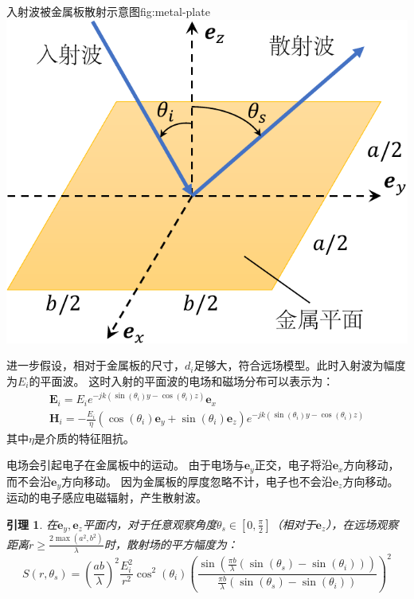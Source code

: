 \documentclass[supercite]{HustGraduPaper}
\newtheorem{lemma}{\indent 引理}[section]
\begin{document}
\begin{generalfig}[htb]{入射波被金属板散射示意图}{fig:metal-plate}
	\includegraphics[width=0.5\linewidth]{Figures/metal-plate.pdf}
\end{generalfig}

进一步假设，相对于金属板的尺寸，$d_i$足够大，符合远场模型。此时入射波为幅度为$E_i$的平面波。
这时入射的平面波的电场和磁场分布可以表示为：
\begin{equation}
	\begin{array}{l}
		\mathbf{E}_{i}=E_{i} e^{-j k\left(\sin \left(\theta_{i}\right) y-\cos \left(\theta_{i}\right) z\right)} \boldsymbol{e}_{x} \\
		\mathbf{H}_{i}=-\frac{E_{i}}{\eta}\left(\cos \left(\theta_{i}\right) \boldsymbol{e}_{y}+\sin \left(\theta_{i}\right) \boldsymbol{e}_{z}\right) e^{-j k\left(\sin \left(\theta_{i}\right) y-\cos \left(\theta_{i}\right) z\right)}
	\end{array}
	\label{eq:e-field}
\end{equation}
其中$\eta$是介质的特征阻抗。

电场会引起电子在金属板中的运动。
由于电场与$\boldsymbol{e}_{y}$正交，电子将沿$\boldsymbol{e}_{x}$方向移动，而不会沿$\boldsymbol{e}_{y}$方向移动。
因为金属板的厚度忽略不计，电子也不会沿$\boldsymbol{e}_{z}$方向移动。
运动的电子感应电磁辐射，产生散射波。

\begin{lemma}
	\label{lemma:scattered-field}
	在$\boldsymbol{e}_{y}, \boldsymbol{e}_{z}$平面内，对于任意观察角度$\theta_{s} \in\left[0, \frac{\pi}{2}\right]$（相对于$\boldsymbol{e}_{z}$），在远场观察距离$r \geq \frac{2 \max \left(a^{2}, b^{2}\right)}{\lambda}$时，散射场的平方幅度为：
	\begin{equation}
		S\left(r, \theta_{s}\right)=\left(\frac{a b}{\lambda}\right)^{2} \frac{E_{i}^{2}}{r^{2}} \cos ^{2}\left(\theta_{i}\right)\left(\frac{\sin \left(\frac{\pi b}{\lambda}\left(\sin \left(\theta_{s}\right)-\sin \left(\theta_{i}\right)\right)\right)}{\frac{\pi b}{\lambda}\left(\sin \left(\theta_{s}\right)-\sin \left(\theta_{i}\right)\right)}\right)^{2}
		\label{eq:scattered-field}
	\end{equation}
\end{lemma}
\end{document}
